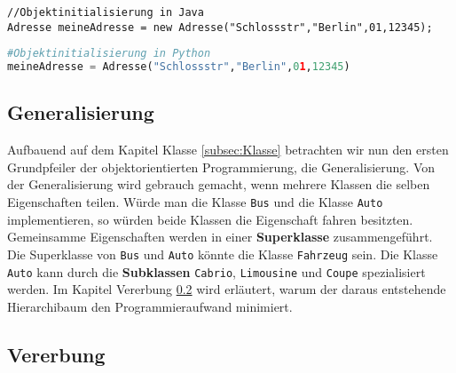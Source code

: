 \begin{lstlisting}[caption=Objektinitialisierung in Java, label=Konstruktor Java]
//Objektinitialisierung in Java
Adresse meineAdresse = new Adresse("Schlossstr","Berlin",01,12345);
\end{lstlisting}

\begin{lstlisting}[caption= Objektinitialisierung in Python, label=ObjektinitialisierungPython,language=Python]
#Objektinitialisierung in Python
meineAdresse = Adresse("Schlossstr","Berlin",01,12345)
\end{lstlisting}

\subsection{Generalisierung} \label{subsec:Generalisierung}

Aufbauend auf dem Kapitel Klasse \ref{subsec:Klasse} betrachten wir nun den ersten Grundpfeiler der objektorientierten Programmierung, die Generalisierung. Von der Generalisierung wird gebrauch gemacht, wenn mehrere Klassen die selben Eigenschaften teilen. Würde man die Klasse \texttt{Bus} und die Klasse \texttt{Auto} implementieren, so würden beide Klassen die Eigenschaft fahren besitzten. Gemeinsamme Eigenschaften werden in einer \textbf{Superklasse} zusammengeführt. Die Superklasse von \texttt{Bus} und \texttt{Auto} könnte die Klasse \texttt{Fahrzeug} sein. Die Klasse \texttt{Auto} kann durch die \textbf{Subklassen} \texttt{Cabrio}, \texttt{Limousine} und \texttt{Coupe} spezialisiert werden. Im Kapitel Vererbung \ref{subsec:Vererbung} wird erläutert, warum der daraus entstehende Hierarchibaum den Programmieraufwand minimiert. 


\subsection{Vererbung} \label{subsec:Vererbung}

